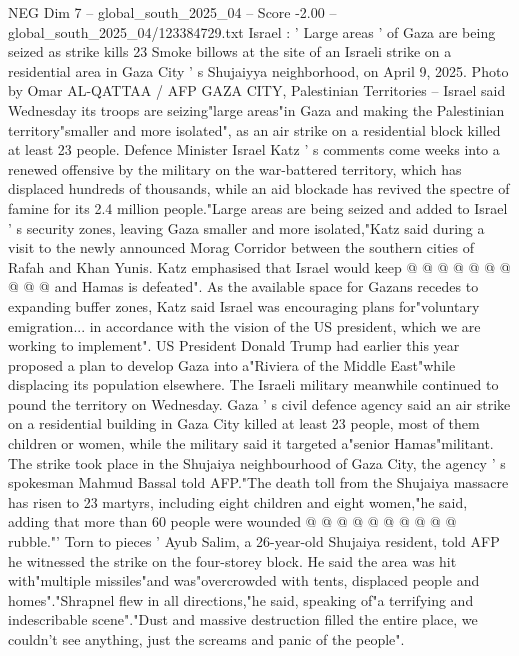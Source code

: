 \begin{textsample}{NEG Dim 7 – global\_south\_2025\_04 – Score -2.00 – global\_south\_2025\_04/123384729.txt}  \label{ex:f7_neg_048}
Israel : ' Large areas ' of Gaza are being seized as strike kills 23 Smoke billows at the site of an Israeli strike on a residential area in Gaza City ' s Shujaiyya neighborhood, on April 9, 2025.
Photo by Omar AL-QATTAA / AFP GAZA CITY, Palestinian Territories -- Israel said Wednesday its troops are seizing"large areas"in Gaza and making the Palestinian territory"smaller and more isolated", as an air strike on a residential block killed at least 23 people.
Defence Minister Israel Katz ' s comments come weeks into a renewed offensive by the military on the war-battered territory, which has displaced hundreds of thousands, while an aid blockade has revived the spectre of famine for its 2.4 million people."Large areas are being seized and added to Israel ' s security zones, leaving Gaza smaller and more isolated,"Katz said during a visit to the newly announced Morag Corridor between the southern cities of Rafah and Khan Yunis.
Katz emphasised that Israel would keep @ @ @ @ @ @ @ @ @ @ and Hamas is defeated".
As the available space for Gazans recedes to expanding buffer zones, Katz said Israel was encouraging plans for"voluntary emigration... in accordance with the vision of the US president, which we are working to implement".
US President Donald Trump had earlier this year proposed a plan to develop Gaza into a"Riviera of the Middle East"while displacing its population elsewhere.
The Israeli military meanwhile continued to pound the territory on Wednesday.
Gaza ' s civil defence agency said an air strike on a residential building in Gaza City killed at least 23 people, most of them children or women, while the military said it targeted a"senior Hamas"militant.
The strike took place in the Shujaiya neighbourhood of Gaza City, the agency ' s spokesman Mahmud Bassal told AFP."The death toll from the Shujaiya massacre has risen to 23 martyrs, including eight children and eight women,"he said, adding that more than 60 people were wounded @ @ @ @ @ @ @ @ @ @ rubble."' Torn to pieces ' Ayub Salim, a 26-year-old Shujaiya resident, told AFP he witnessed the strike on the four-storey block.
He said the area was hit with"multiple missiles"and was"overcrowded with tents, displaced people and homes"."Shrapnel flew in all directions,"he said, speaking of"a terrifying and indescribable scene"."Dust and massive destruction filled the entire place, we couldn't see anything, just the screams and panic of the people".

\end{textsample}
